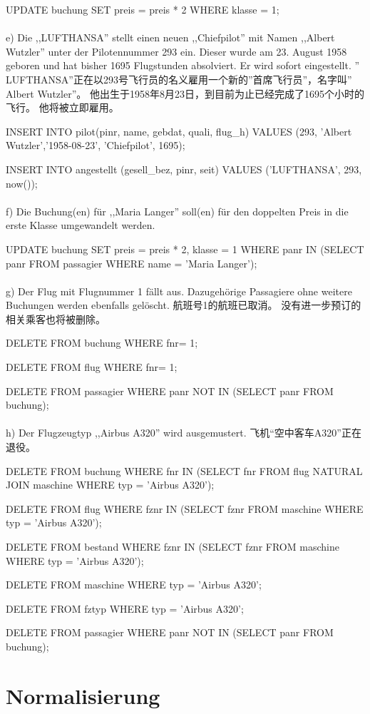 \documentclass[fleqn]{article}
\begin{document}
UPDATE buchung SET preis = preis * 2 WHERE klasse = 1;
\\
\\
e) Die ,,LUFTHANSA'' stellt einen neuen ,,Chiefpilot'' mit Namen ,,Albert Wutzler'' unter der Pilotennummer 293 ein. Dieser wurde am 23. August 1958 geboren und hat bisher 1695 Flugstunden absolviert. Er wird sofort eingestellt.
'' LUFTHANSA”正在以293号飞行员的名义雇用一个新的''首席飞行员”，名字叫'' Albert Wutzler”。 他出生于1958年8月23日，到目前为止已经完成了1695个小时的飞行。 他将被立即雇用。

INSERT INTO pilot(pinr, name, gebdat, quali, flug\_h) VALUES (293, 'Albert Wutzler','1958-08-23', 'Chiefpilot', 1695);

INSERT INTO angestellt (gesell\_bez, pinr, seit) VALUES ('LUFTHANSA', 293, now());
\\
\\
f) Die Buchung(en) für ,,Maria Langer'' soll(en) für den doppelten Preis in die erste Klasse umgewandelt werden.

UPDATE buchung SET preis = preis * 2, klasse = 1 WHERE panr IN (SELECT panr FROM passagier WHERE name = 'Maria Langer');
\\
\\
g) Der Flug mit Flugnummer 1 fällt aus. Dazugehörige Passagiere ohne weitere Buchungen werden ebenfalls gelöscht.
航班号1的航班已取消。 没有进一步预订的相关乘客也将被删除。

DELETE FROM buchung WHERE fnr= 1;

DELETE FROM flug WHERE fnr= 1;

DELETE FROM passagier WHERE panr NOT IN (SELECT panr FROM buchung);
\\
\\
h) Der Flugzeugtyp ,,Airbus A320'' wird ausgemustert. 飞机“空中客车A320”正在退役。

DELETE FROM buchung WHERE fnr IN (SELECT fnr FROM flug NATURAL JOIN maschine WHERE typ = 'Airbus A320');

DELETE FROM flug WHERE fznr IN (SELECT fznr FROM maschine WHERE typ = 'Airbus A320');

DELETE FROM bestand WHERE fznr IN (SELECT fznr FROM maschine WHERE typ = 'Airbus A320');

DELETE FROM maschine WHERE typ = 'Airbus A320';

DELETE FROM fztyp WHERE typ = 'Airbus A320';

DELETE FROM passagier WHERE panr NOT IN (SELECT panr FROM buchung);

\section{Normalisierung}
\end{document}
